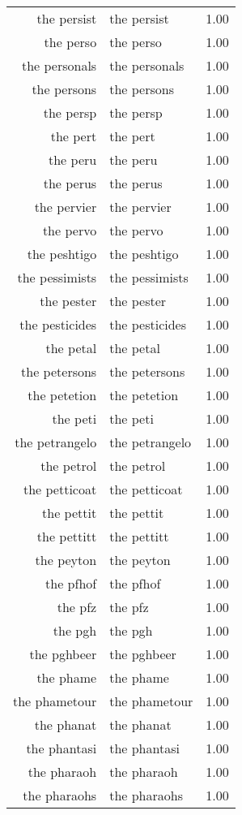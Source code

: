 \begin{table}[ht]
\begin{tabular}{rlr}
  the persist & the persist & 1.00 \\ 
  the perso & the perso & 1.00 \\ 
  the personals & the personals & 1.00 \\ 
  the persons & the persons & 1.00 \\ 
  the persp & the persp & 1.00 \\ 
  the pert & the pert & 1.00 \\ 
  the peru & the peru & 1.00 \\ 
  the perus & the perus & 1.00 \\ 
  the pervier & the pervier & 1.00 \\ 
  the pervo & the pervo & 1.00 \\ 
  the peshtigo & the peshtigo & 1.00 \\ 
  the pessimists & the pessimists & 1.00 \\ 
  the pester & the pester & 1.00 \\ 
  the pesticides & the pesticides & 1.00 \\ 
  the petal & the petal & 1.00 \\ 
  the petersons & the petersons & 1.00 \\ 
  the petetion & the petetion & 1.00 \\ 
  the peti & the peti & 1.00 \\ 
  the petrangelo & the petrangelo & 1.00 \\ 
  the petrol & the petrol & 1.00 \\ 
  the petticoat & the petticoat & 1.00 \\ 
  the pettit & the pettit & 1.00 \\ 
  the pettitt & the pettitt & 1.00 \\ 
  the peyton & the peyton & 1.00 \\ 
  the pfhof & the pfhof & 1.00 \\ 
  the pfz & the pfz & 1.00 \\ 
  the pgh & the pgh & 1.00 \\ 
  the pghbeer & the pghbeer & 1.00 \\ 
  the phame & the phame & 1.00 \\ 
  the phametour & the phametour & 1.00 \\ 
  the phanat & the phanat & 1.00 \\ 
  the phantasi & the phantasi & 1.00 \\ 
  the pharaoh & the pharaoh & 1.00 \\ 
  the pharaohs & the pharaohs & 1.00 \\ 

\end{tabular}
\end{table}
